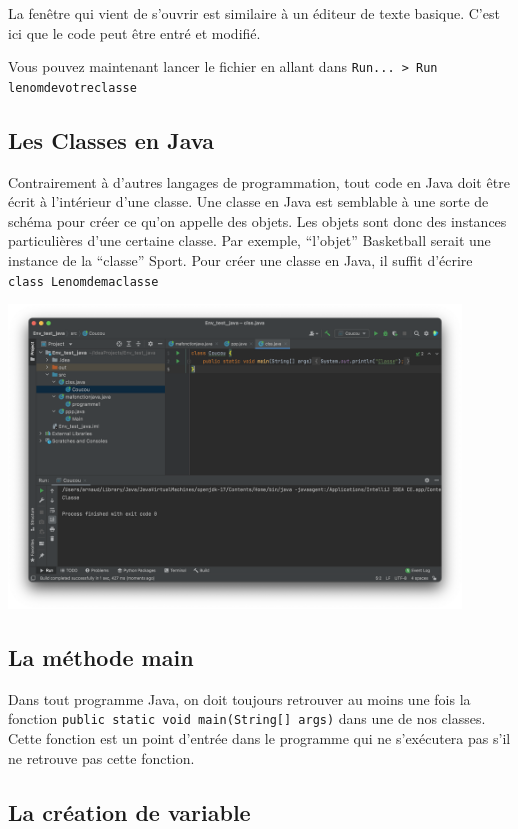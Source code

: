 La fenêtre qui vient de s'ouvrir est similaire à un éditeur de texte basique. C'est ici que le code peut être entré et modifié.

Vous pouvez maintenant lancer le fichier en allant dans \lstinline{Run... > Run lenomdevotreclasse}

\subsection{Les Classes en Java}

Contrairement à d'autres langages de programmation, tout code en Java doit être écrit à l'intérieur d'une classe. Une classe en Java est semblable à une sorte de schéma pour créer ce qu'on appelle des objets. Les objets sont donc des instances particulières d'une certaine classe. Par exemple, ``l'objet'' Basketball serait une instance de la ``classe'' Sport. Pour créer une classe en Java, il suffit d'écrire \lstinline{class Lenomdemaclasse}

\begin{center}
	\includegraphics[width=12cm]{clss}	
\end{center}

\subsection{La méthode main}
Dans tout programme Java, on doit toujours retrouver au moins une fois la fonction \lstinline{public static void main(String[] args)} dans une de nos classes. Cette fonction est un point d'entrée dans le programme qui ne s'exécutera pas s'il ne retrouve pas cette fonction.
\subsection{La création de variable}

